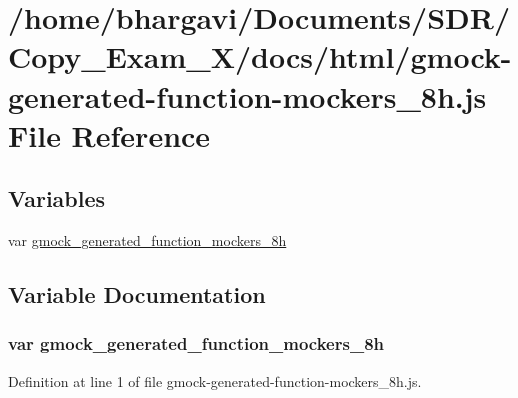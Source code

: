 \hypertarget{gmock-generated-function-mockers__8h_8js}{}\section{/home/bhargavi/\+Documents/\+S\+D\+R/\+Copy\+\_\+\+Exam\+\_\+X/docs/html/gmock-\/generated-\/function-\/mockers\+\_\+8h.js File Reference}
\label{gmock-generated-function-mockers__8h_8js}
\subsection*{Variables}
\begin{DoxyCompactItemize}
\item 
var \hyperlink{gmock-generated-function-mockers__8h_8js_a12cf718a616f9ec02123065b8664a7e3}{gmock\+\_\+generated\+\_\+function\+\_\+mockers\+\_\+8h}
\end{DoxyCompactItemize}


\subsection{Variable Documentation}
\subsubsection[{\texorpdfstring{gmock\+\_\+generated\+\_\+function\+\_\+mockers\+\_\+8h}{gmock_generated_function_mockers_8h}}]{\setlength{\rightskip}{0pt plus 5cm}var gmock\+\_\+generated\+\_\+function\+\_\+mockers\+\_\+8h}\hypertarget{gmock-generated-function-mockers__8h_8js_a12cf718a616f9ec02123065b8664a7e3}{}\label{gmock-generated-function-mockers__8h_8js_a12cf718a616f9ec02123065b8664a7e3}


Definition at line 1 of file gmock-\/generated-\/function-\/mockers\+\_\+8h.\+js.

